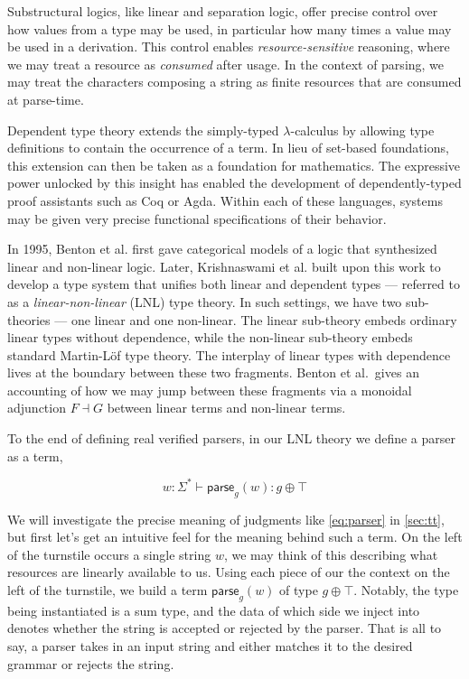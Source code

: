 \documentclass[acmsmall,screen,nonacm]{acmart}
\newcommand{\String}{\Sigma^{*}}
\begin{document}
Substructural logics, like linear and separation logic, offer precise control
over how values from a type may be used, in particular how many times a value
may be used in a derivation. This control enables \emph{resource-sensitive}
reasoning, where we may treat a resource as \emph{consumed} after usage. In the
context of parsing, we may treat the characters composing a string as finite resources
that are consumed at parse-time.

Dependent type theory extends the simply-typed $\lambda$-calculus by allowing type
definitions to contain the occurrence of a term. In lieu of set-based
foundations, this extension can then be taken as a foundation for mathematics.
The expressive power unlocked by this insight has enabled the development of
dependently-typed proof assistants
such as Coq or Agda. Within each of these languages, systems may be given very
precise functional specifications of their behavior.

In 1995, Benton et al.
\cite{bentonMixedLinearNonlinear1995} first gave categorical models of a logic
that synthesized linear and non-linear logic. Later, Krishnaswami et al.
\cite{krishnaswami_integrating_2015} built upon this work to develop a type
system that unifies both linear and
dependent types --- referred to as a \emph{linear-non-linear} (LNL) type theory. In
such settings, we have two sub-theories --- one linear and one non-linear. The
linear sub-theory embeds ordinary linear types without dependence, while the
non-linear sub-theory embeds standard Martin-L\"of type theory. The interplay of
linear types with dependence lives at the boundary between these two fragments.
Benton et al.\ gives an accounting of how we may jump between these
fragments via a monoidal adjunction $F \dashv G$ between linear terms and
non-linear terms.

To the end of defining real verified
parsers, in our LNL theory we define a parser as a term,

\begin{equation}
  \label{eq:parser}
  w : \String \vdash \mathsf{parse}_{g}(w) : g \oplus \top
\end{equation}

We will investigate the precise meaning of judgments like \cref{eq:parser} in
\cref{sec:tt}, but first let's get an intuitive feel for the meaning behind such a
term. On the left of the turnstile occurs a single string $w$, we may think of
this describing what resources are linearly available to us. Using each piece of
our the context on the left of the turnstile, we build a term
$\mathsf{parse}_{g}(w)$ of type $g \oplus \top$. Notably, the type being
instantiated is a sum type, and the data of which side we inject into denotes
whether the string is accepted or rejected by the parser. That is all to say, a
parser takes in an input string and either matches it to the desired grammar or
rejects the string.
\end{document}
